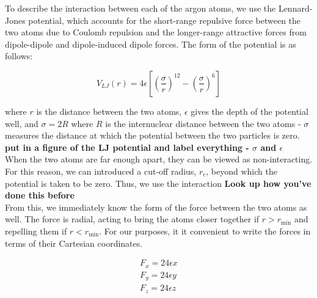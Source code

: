 \documentclass{article}
\begin{document}
\begin{multicols}{2}
To describe the interaction between each of the argon atoms, we use the Lennard-Jones potential, which accounts for the short-range repulsive force between the two atoms due to Coulomb repulsion and the longer-range attractive forces from dipole-dipole and dipole-induced dipole forces.  The form of the potential is as follows:

\begin{equation}
V_{LJ}(r) = 4 \epsilon \left [ \left (\frac{\sigma}{r} \right )^{12} - \left (\frac{\sigma}{r} \right )^{6} \right ]
\end{equation}

\noindent where $r$ is the distance between the two atoms, $\epsilon$ gives the depth of the potential well, and $\sigma = 2R $ where $R$ is the internuclear distance between the two atoms - $\sigma$ measures the distance at which the potential between the two particles is zero.  \\

\textbf{put in a figure of the LJ potential and label everything - $\sigma$ and $\epsilon$} \\

When the two atoms are far enough apart, they can be viewed as non-interacting.  For this reason, we can introduced a cut-off radius, $r_c$, beyond which the potential is taken to be zero.  Thus, we use the interaction \textbf{Look up how you've done this before} \\


From this, we immediately know the form of the force between the two atoms as well.  The force is radial, acting to bring the atoms closer together if $r > r_{\mathrm{min}}$ and repelling them if $r < r_{\mathrm{min}}$.  For our purposes, it it convenient to write the forces in terms of their Cartesian coordinates.  

\begin{equation}
\begin{split}
F_x = 24\epsilon x \\
F_y = 24 \epsilon y\\
F_z = 24 \epsilon z \\
\end{split}
\end{equation}


\end{multicols}
\end{document}
